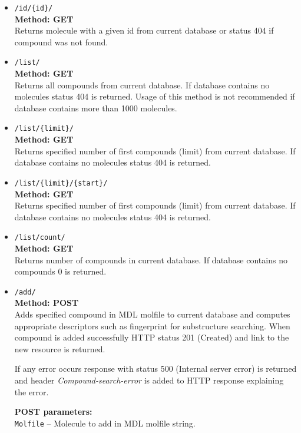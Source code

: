 \documentclass[thesis=M,english]{FITthesis}[2012/10/20]
\begin{document}
\begin{itemize}
\item \texttt{/id/\{id\}/} \\
\textbf{Method: GET} \\ 
Returns molecule with a given id from current database or status 404 if compound was not found.

\item \texttt{/list/} \\
\textbf{Method: GET} \\ 
Returns all compounds from current database. If database contains no molecules status 404 is returned. Usage of this method is not recommended if database contains more than 1000 molecules. 

\item \texttt{/list/\{limit\}/} \\
\textbf{Method: GET} \\ 
Returns specified number of first compounds (limit) from current database. If database contains no molecules status 404 is returned. 

\item \texttt{/list/\{limit\}/\{start\}/} \\
\textbf{Method: GET} \\ 
Returns specified number of first compounds (limit) from current database. If database contains no molecules status 404 is returned. 

\item \texttt{/list/count/} \\
\textbf{Method: GET} \\ 
Returns number of compounds in current database. If database contains no compounds 0 is returned. 

\item \texttt{/add/} \\
\textbf{Method: POST} \\ 
Adds specified compound in MDL molfile to current database and computes appropriate descriptors such as fingerprint for substructure searching. When compound is added successfully HTTP status 201 (Created) and link to the new resource is returned.

If any error occurs response with status 500 (Internal server error) is returned and header \textit{Compound-search-error} is added to HTTP response explaining the error.

\textbf{POST parameters:} \\
\texttt{Molfile} – Molecule to add in MDL molfile string. 



\end{itemize}
\end{document}
